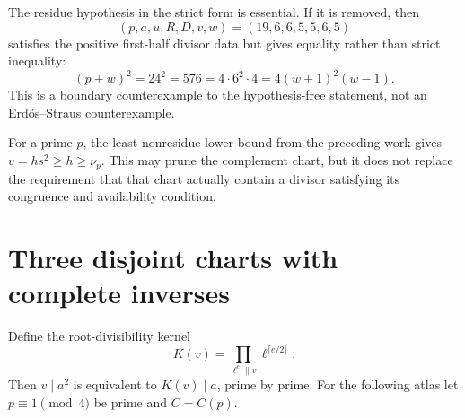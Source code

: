 The residue hypothesis in the strict form is essential.  If it is removed,
then
\[
 (p,a,u,R,D,v,w)=(19,6,6,5,5,6,5)
\]
satisfies the positive first-half divisor data but gives equality rather than
strict inequality:
\[
 (p+w)^2=24^2=576=4\cdot6^2\cdot4
              =4(w+1)^2(w-1).
\]
This is a boundary counterexample to the hypothesis-free statement, not an
Erd\H{o}s--Straus counterexample.

For a prime $p$, the least-nonresidue lower bound from the preceding work gives
$v=hs^2\ge h\ge\nu_p$. This may prune the complement chart, but it does not
replace the requirement that that chart actually contain a divisor satisfying
its congruence and availability condition.

\section{Three disjoint charts with complete inverses}
Define the root-divisibility kernel
\[
 K(v)=\prod_{\ell^e\parallel v}\ell^{\lceil e/2\rceil}.
\]
Then $v\mid a^2$ is equivalent to $K(v)\mid a$, prime by prime.
For the following atlas let $p\equiv1\pmod4$ be prime and $C=C(p)$.

